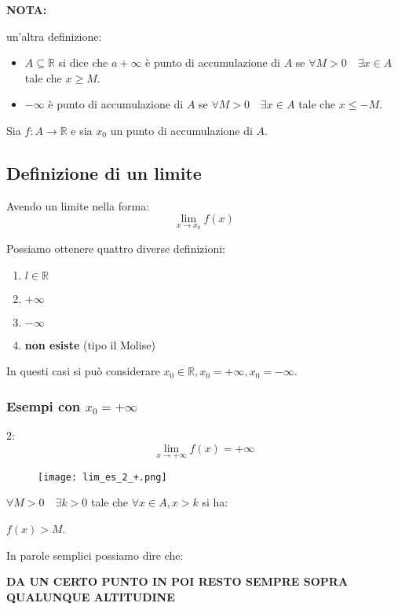 \documentclass[../main.tex, class=article, 12pt]{subfiles}
\begin{document}
\begin{tcolorbox}
       \textbf{NOTA:}
\end{tcolorbox}


\begin{definition}
        un'altra definizione:
        \begin{itemize}
                \item $ A \subseteq \mathbb{R} $ si dice che $ a + \infty $ è punto di accumulazione di $ A $ se $ \forall M > 0 \quad  \exists x \in A$ tale che $ x \ge M $.
                \item $ - \infty $ è punto di accumulazione di $ A $ se $ \forall M>0 \quad \exists x \in A $ tale che $ x \le -M $.
        \end{itemize}
\end{definition}

Sia $ f : A \to \mathbb{R} $ e sia $ x_0 $ un punto di accumulazione di $ A $.



\subsection{Definizione di un limite}\label{sec:definizione_di_un_limite}
Avendo un limite nella forma:
\begin{equation*}
        \lim_{x \to x_0} f(x)
\end{equation*}

Possiamo ottenere quattro diverse definizioni:
\begin{enumerate}
        \item $\boxed{l \in \mathbb{R}}$
        \item $\boxed{+\infty}$
        \item $\boxed{-\infty}$
        \item \textbf{non esiste} (tipo il Molise) 
\end{enumerate}
In questi casi si può considerare $ x_0 \in \mathbb{R}, x_0 = + \infty, x_0 = -\infty$.


\subsubsection{Esempi con $ x_0 = +\infty $}
\begin{exmp}
        2:
        \begin{equation*}
               \boxed{\lim_{x \to +\infty} f(x) = +\infty}
        \end{equation*}
        \begin{figure}[H]
          	\texttt{[image: lim\_es\_2\_+.png]}
          	\caption{}
        \end{figure}
        
        $ \forall M > 0 \quad  \exists k > 0$  tale che $ \forall x \in A, x > k $ si ha:\par $ f(x) > M $. \par
        In parole semplici possiamo dire che:\par \textbf{DA UN CERTO PUNTO IN POI RESTO SEMPRE SOPRA QUALUNQUE ALTITUDINE}
\end{exmp}
\end{document}
